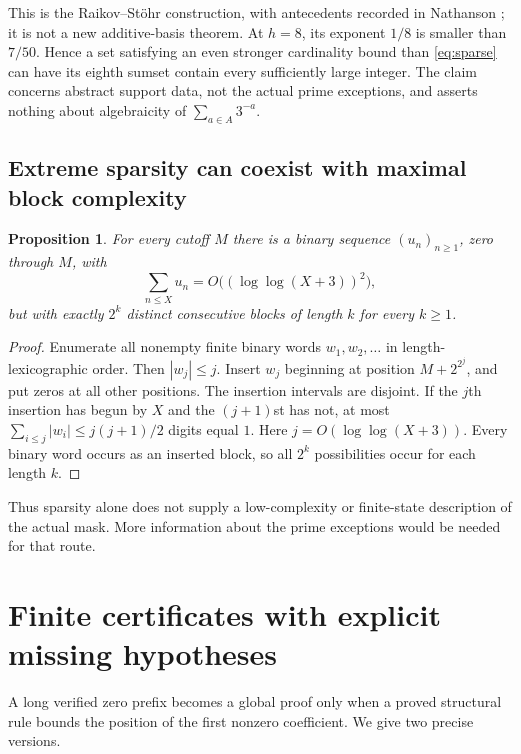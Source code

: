 \documentclass[11pt,a4paper]{article}
\newtheorem{proposition}[theorem]{Proposition}
\theoremstyle{definition}
\theoremstyle{remark}\newtheorem{remark}[theorem]{Remark}
\begin{document}
This is the Raikov--St\"ohr construction, with antecedents recorded
in Nathanson \cite{Nathanson}; it is not a new additive-basis theorem.
At $h=8$, its exponent $1/8$ is smaller than $7/50$. Hence a set
satisfying an even stronger cardinality bound than
\eqref{eq:sparse} can have its eighth sumset contain every
sufficiently large integer. The claim concerns abstract support
data, not the actual prime exceptions, and asserts nothing about
algebraicity of $\sum_{a\in A}3^{-a}$.

\subsection{Extreme sparsity can coexist with maximal block complexity}

\begin{proposition}\label{prop:complexity}
For every cutoff $M$ there is a binary sequence $(u_n)_{n\ge1}$,
zero through $M$, with
\[
 \sum_{n\le X}u_n=O\bigl((\log\log(X+3))^2\bigr),
\]
but with exactly $2^k$ distinct consecutive blocks of length $k$
for every $k\ge1$.
\end{proposition}
\begin{proof}
Enumerate all nonempty finite binary words $w_1,w_2,\ldots$ in
length-lexicographic order. Then $|w_j|\le j$. Insert $w_j$
beginning at position $M+2^{2^j}$, and put zeros at all other
positions. The insertion intervals are disjoint. If the $j$th
insertion has begun by $X$ and the $(j+1)$st has not, at most
$\sum_{i\le j}|w_i|\le j(j+1)/2$ digits equal $1$.
Here $j=O(\log\log(X+3))$. Every binary word occurs as an inserted
block, so all $2^k$ possibilities occur for each length $k$.
\end{proof}

Thus sparsity alone does not supply a low-complexity or finite-state
description of the actual mask. More information about the prime
exceptions would be needed for that route.

\section{Finite certificates with explicit missing hypotheses}
\label{sec:certificates}

A long verified zero prefix becomes a global proof only when a
proved structural rule bounds the position of the first nonzero
coefficient. We give two precise versions.
\end{document}
